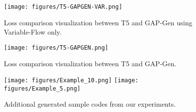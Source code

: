 \documentclass[11pt]{article}
\begin{document}
\begin{figure*}[ht] 
\centering
\texttt{[image: figures/T5-GAPGEN-VAR.png]}
\vspace{-10pt}
\caption{Loss comparison visualization between T5 and GAP-Gen using Variable-Flow only.}
\label{fig:t5-gap-gen-var}
\end{figure*}

\begin{figure*}[ht] 
\centering
\texttt{[image: figures/T5-GAPGEN.png]}
\vspace{-10pt}
\caption{Loss comparison visualization between T5 and GAP-Gen.}
\label{fig:t5-gap-gen}
\end{figure*}

\begin{figure*}[ht] 
\texttt{[image: figures/Example\_10.png]}
\texttt{[image: figures/Example\_5.png]}
\vspace{-10pt}
\caption{Additional generated sample codes from our experiments.}
\label{fig:t5-gap-gen}
\end{figure*}
\end{document}
